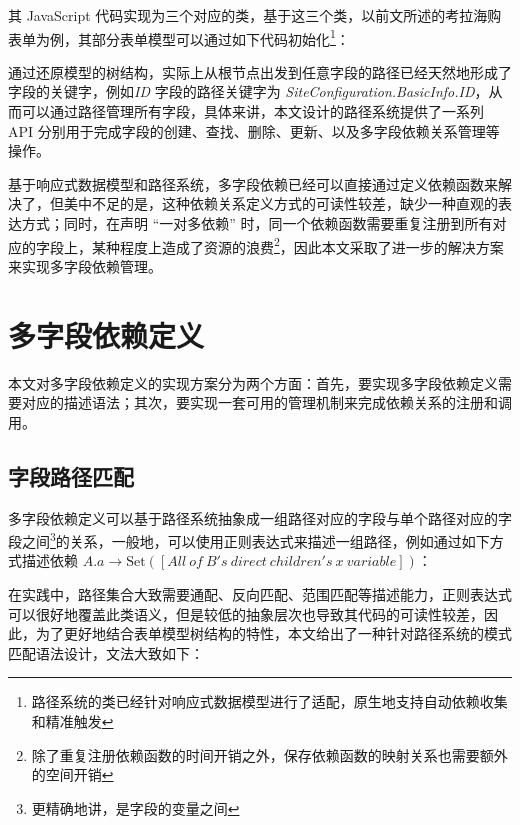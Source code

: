 \documentclass[winfonts,master,twoside]{njuthesis}
\begin{document}
其 JavaScript 代码实现为三个对应的类，基于这三个类，以前文所述的考拉海购表单为例，其部分表单模型可以通过如下代码初始化\footnote{路径系统的类已经针对响应式数据模型进行了适配，原生地支持自动依赖收集和精准触发}：



通过还原模型的树结构，实际上从根节点出发到任意字段的路径已经天然地形成了字段的关键字，例如\textit{ID} 字段的路径关键字为 \textit{SiteConfiguration.BasicInfo.ID}，从而可以通过路径管理所有字段，具体来讲，本文设计的路径系统提供了一系列 API 分别用于完成字段的创建、查找、删除、更新、以及多字段依赖关系管理等操作。

基于响应式数据模型和路径系统，多字段依赖已经可以直接通过定义依赖函数来解决了，但美中不足的是，这种依赖关系定义方式的可读性较差，缺少一种直观的表达方式；同时，在声明 “一对多依赖” 时，同一个依赖函数需要重复注册到所有对应的字段上，某种程度上造成了资源的浪费\footnote{除了重复注册依赖函数的时间开销之外，保存依赖函数的映射关系也需要额外的空间开销}，因此本文采取了进一步的解决方案来实现多字段依赖管理。

\section{多字段依赖定义}

本文对多字段依赖定义的实现方案分为两个方面：首先，要实现多字段依赖定义需要对应的描述语法；其次，要实现一套可用的管理机制来完成依赖关系的注册和调用。

\subsection{字段路径匹配}\label{node-path-match}

多字段依赖定义可以基于路径系统抽象成一组路径对应的字段与单个路径对应的字段之间\footnote{更精确地讲，是字段的变量之间}的关系，一般地，可以使用正则表达式来描述一组路径，例如通过如下方式描述依赖 $A.a \rightarrow \text{Set}([All\ of\ B's\ direct\ children's\ x\ variable])$：



在实践中，路径集合大致需要通配、反向匹配、范围匹配等描述能力，正则表达式可以很好地覆盖此类语义，但是较低的抽象层次也导致其代码的可读性较差，因此，为了更好地结合表单模型树结构的特性，本文给出了一种针对路径系统的模式匹配语法设计，文法大致如下：
\end{document}
